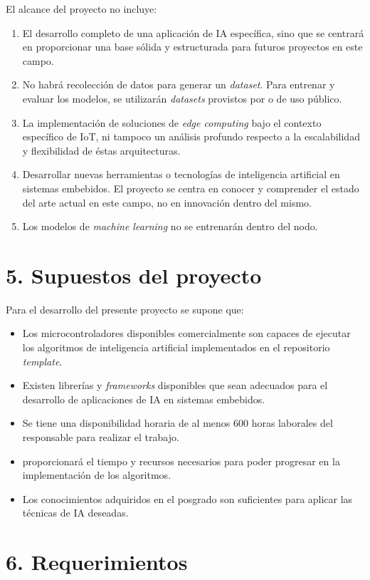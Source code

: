 \documentclass[
11pt, %
codirector, %
]{charter}
\begin{document}
El alcance del proyecto no incluye:
\begin{enumerate}
\item  El desarrollo completo de una aplicación de IA específica, sino que se centrará en proporcionar una base sólida y estructurada para futuros proyectos en este campo. 
\item No habrá recolección de datos para generar un \textit{dataset}. Para entrenar y evaluar los modelos, se utilizarán \textit{datasets} provistos por \empclientename o de uso público. 
\item La implementación de soluciones de \textit{edge computing} bajo el contexto específico de IoT, ni tampoco un análisis profundo respecto a la escalabilidad y flexibilidad de éstas arquitecturas. 
\item Desarrollar nuevas herramientas o tecnologías de inteligencia artificial en sistemas embebidos. El proyecto se centra en conocer y comprender el estado del arte actual en este campo, no en innovación dentro del mismo.
\item Los modelos de \textit{machine learning} no se entrenarán dentro del nodo.
\end{enumerate}


\section{5. Supuestos del proyecto}
\label{sec:supuestos}
Para el desarrollo del presente proyecto se supone que: 
\begin{itemize}
	\item Los microcontroladores disponibles comercialmente son capaces de ejecutar los algoritmos de inteligencia artificial implementados en el repositorio \textit{template}.
	\item Existen librerías y \textit{frameworks} disponibles que sean adecuados para el desarrollo de aplicaciones de IA en sistemas embebidos.
	\item Se tiene una disponibilidad horaria de al menos 600 horas laborales del responsable para realizar el trabajo. 
	\item \empclientename proporcionará el tiempo y recursos necesarios para poder progresar en la implementación de los algoritmos.
	\item Los conocimientos adquiridos en el posgrado son suficientes para aplicar las técnicas de IA deseadas.
\end{itemize}


\section{6. Requerimientos}
\label{sec:requerimientos}
\end{document}
